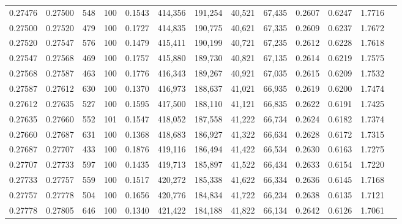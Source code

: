 \begin{tabular}{rrrrrrrrrrrrr}
0.27476 & 0.27500 &   548 & 100 &                                     0.1543 & 414,356 & 191,254 &  40,521 &  67,435 & 0.2607 & 0.6247 & 1.7716 \\
0.27500 & 0.27520 &   479 & 100 &                                     0.1727 & 414,835 & 190,775 &  40,621 &  67,335 & 0.2609 & 0.6237 & 1.7672 \\
0.27520 & 0.27547 &   576 & 100 &                                     0.1479 & 415,411 & 190,199 &  40,721 &  67,235 & 0.2612 & 0.6228 & 1.7618 \\
0.27547 & 0.27568 &   469 & 100 &                                     0.1757 & 415,880 & 189,730 &  40,821 &  67,135 & 0.2614 & 0.6219 & 1.7575 \\
0.27568 & 0.27587 &   463 & 100 &                                     0.1776 & 416,343 & 189,267 &  40,921 &  67,035 & 0.2615 & 0.6209 & 1.7532 \\
0.27587 & 0.27612 &   630 & 100 &                                     0.1370 & 416,973 & 188,637 &  41,021 &  66,935 & 0.2619 & 0.6200 & 1.7474 \\
0.27612 & 0.27635 &   527 & 100 &                                     0.1595 & 417,500 & 188,110 &  41,121 &  66,835 & 0.2622 & 0.6191 & 1.7425 \\
0.27635 & 0.27660 &   552 & 101 &                                     0.1547 & 418,052 & 187,558 &  41,222 &  66,734 & 0.2624 & 0.6182 & 1.7374 \\
0.27660 & 0.27687 &   631 & 100 &                                     0.1368 & 418,683 & 186,927 &  41,322 &  66,634 & 0.2628 & 0.6172 & 1.7315 \\
0.27687 & 0.27707 &   433 & 100 &                                     0.1876 & 419,116 & 186,494 &  41,422 &  66,534 & 0.2630 & 0.6163 & 1.7275 \\
0.27707 & 0.27733 &   597 & 100 &                                     0.1435 & 419,713 & 185,897 &  41,522 &  66,434 & 0.2633 & 0.6154 & 1.7220 \\
0.27733 & 0.27757 &   559 & 100 &                                     0.1517 & 420,272 & 185,338 &  41,622 &  66,334 & 0.2636 & 0.6145 & 1.7168 \\
0.27757 & 0.27778 &   504 & 100 &                                     0.1656 & 420,776 & 184,834 &  41,722 &  66,234 & 0.2638 & 0.6135 & 1.7121 \\
0.27778 & 0.27805 &   646 & 100 &                                     0.1340 & 421,422 & 184,188 &  41,822 &  66,134 & 0.2642 & 0.6126 & 1.7061 \\

\end{tabular}
